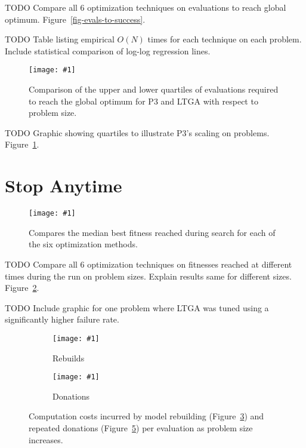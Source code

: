 \documentclass[twoside]{article}
\newcommand{\includegraphicsfit}[1]
{\texttt{[image: \#1]}}
\begin{document}
TODO Compare all 6 optimization techniques on evaluations to reach global optimum.  Figure~\ref{fig-evals-to-success}.

TODO Table listing empirical $O(N)$ times for each technique on each problem. Include
statistical comparison of log-log regression lines.

\begin{figure}[t]
  \begin{center}
  \includegraphicsfit{evals-to-success-range}
  \end{center}
  \caption{Comparison of the upper and lower quartiles of evaluations required
           to reach the global optimum for P3 and LTGA with respect to problem size.}
  \label{fig-evals-to-success-range}
\end{figure}

TODO Graphic showing quartiles to illustrate P3's scaling on problems. Figure~\ref{fig-evals-to-success-range}.

\section{Stop Anytime}
\begin{figure}[t]
  \begin{center}
  \includegraphicsfit{fitness-over-time}
  \end{center}
  \caption{Compares the median best fitness reached during search for each of the six optimization methods.}
  \label{fig-fitness-over-time}
\end{figure}

TODO Compare all 6 optimization techniques on fitnesses reached at different times
during the run on problem sizes. Explain results same for different sizes. Figure~\ref{fig-fitness-over-time}.

TODO Include graphic for one problem where LTGA was tuned using a significantly higher failure rate.

\begin{figure}[t]
  \begin{centering}
    \begin{subfigure}{.5\textwidth}
      \begin{centering}
        \includegraphicsfit{rebuilds}
      \end{centering}
      \caption{Rebuilds}
      \label{fig-rebuilds}
    \end{subfigure}%
    \begin{subfigure}{.5\textwidth}
      \begin{centering}
        \includegraphicsfit{donations}
      \end{centering}
      \caption{Donations}
      \label{fig-donations}
    \end{subfigure}
  \end{centering}
  \caption{Computation costs incurred by model rebuilding (Figure~\ref{fig-rebuilds}) and
           repeated donations (Figure~\ref{fig-donations}) per evaluation as problem size increases.}
\end{figure}
\end{document}
